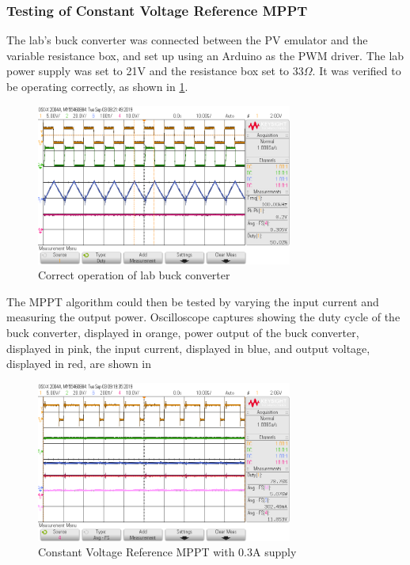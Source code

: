 \documentclass[]{article}
\begin{document}
            \subsubsection{Testing of Constant Voltage Reference MPPT}
                The lab's buck converter was connected between the PV emulator and the variable resistance box, and set up using an Arduino as the PWM driver. The lab power supply was set to 21V and the resistance box set to $33\Omega$. It was verified to be operating correctly, as shown in \cref{fig:lab3buck}.
                \begin{figure}[H]
                    \centering
                    \includegraphics[width=0.75\textwidth]{Lab3Results/BuckTest_50DutyCycle_100KHz}
                    \caption{Correct operation of lab buck converter}
                    \label{fig:lab3buck}
                \end{figure}
                The MPPT algorithm could then be tested by varying the input current and measuring the output power. Oscilloscope captures showing the duty cycle of the buck converter, displayed in orange, power output of the buck converter, displayed in pink, the input current, displayed in blue, and output voltage, displayed in red, are shown in 
                \begin{figure}[H]
                    \centering
                    \includegraphics[width=0.75\textwidth]{Lab3Results/0_30A_Supply}
                    \caption{Constant Voltage Reference MPPT with 0.3A supply}
                    \label{fig:Lab3_0.3A}
                \end{figure}
\end{document}
